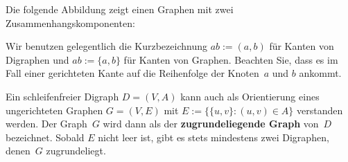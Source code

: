\begin{bsp}
Die folgende Abbildung zeigt einen Graphen mit zwei Zusammenhangskomponenten:\\

\begin{center}
\end{center}
\end{bsp} 

\begin{bem}
Wir benutzen gelegentlich die Kurzbezeichnung $ab:=(a,b)$ für Kanten von Digraphen und $ab:=\{a,b\}$ für Kanten von Graphen.
Beachten Sie, dass es im Fall einer gerichteten Kante auf die Reihenfolge der Knoten~$a$ und $b$ ankommt.
\end{bem}

\begin{defn}
Ein schleifenfreier Digraph $D = (V,A)$ kann auch als Orientierung eines ungerichteten Graphen $G=(V,E)$ mit $E := \{\{u,v\} : (u,v) \in A\}$ verstanden werden.
Der Graph~$G$ wird dann als der \textbf{zugrundeliegende Graph} von~$D$ bezeichnet.
Sobald $E$ nicht leer ist, gibt es stets mindestens zwei Digraphen, denen~$G$ zugrundeliegt.
\end{defn} 

